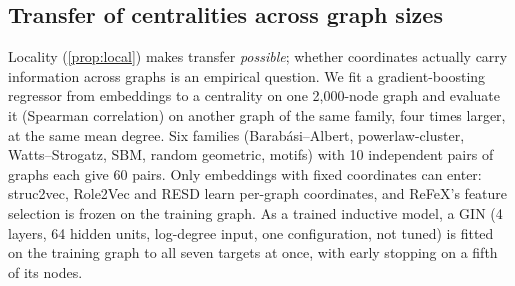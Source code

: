 \documentclass[10pt]{article}
\theoremstyle{definition}
\begin{document}
\subsection{Transfer of centralities across graph sizes}\label{sec:transfer}

Locality (\cref{prop:local}) makes transfer \emph{possible}; whether coordinates actually carry information across graphs is an empirical question.
We fit a gradient-boosting regressor from embeddings to a centrality on one 2,000-node graph and evaluate it (Spearman correlation) on another graph of the same family, four times larger, at the same mean degree.
Six families (Barabási--Albert, powerlaw-cluster, Watts--Strogatz, SBM, random geometric, motifs) with 10 independent pairs of graphs each give 60 pairs.
Only embeddings with fixed coordinates can enter: struc2vec, Role2Vec and RESD learn per-graph coordinates, and ReFeX's feature selection is frozen on the training graph. As a trained inductive model, a GIN \citep{xu2019} (4 layers, 64 hidden units, log-degree input, one configuration, not tuned) is fitted on the training graph to all seven targets at once, with early stopping on a fifth of its nodes.
\end{document}
